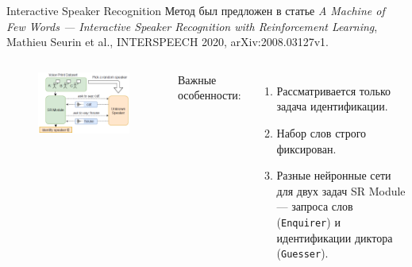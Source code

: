 \documentclass[aspectratio=169]{beamer}
\newcommand{\guesser}{\texttt{Guesser}}
\newcommand{\enquirer}{\texttt{Enquirer}}
\begin{document}
\begin{frame}{Interactive Speaker Recognition}
    Метод был предложен в статье \textit{A Machine of Few Words --- Interactive
    Speaker Recognition with Reinforcement Learning}, Mathieu Seurin et al.,
    INTERSPEECH 2020, arXiv:2008.03127v1.\vspace{1em}

    \begin{columns}
    
    \begin{figure}[bht]
        \includegraphics[width=.9\textwidth]{isr_game_large.png}
    \end{figure}

    Важные особенности:
    \begin{enumerate}
        \item Рассматривается только задача идентификации.
        \item Набор слов строго фиксирован.
        \item Разные нейронные сети для двух задач SR Module --- запроса слов
        (\enquirer) и идентификации диктора (\guesser).
    \end{enumerate}
    \end{columns}
\end{frame}
\end{document}
